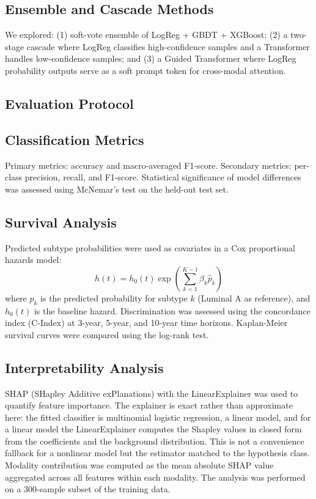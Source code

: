 \documentclass[10pt,journal,compsoc,twocolumn]{IEEEtran}
\begin{document}
\subsection{Ensemble and Cascade Methods}
We explored: (1) soft-vote ensemble of LogReg + GBDT + XGBoost; (2) a two-stage cascade where LogReg classifies high-confidence samples and a Transformer handles low-confidence samples; and (3) a Guided Transformer where LogReg probability outputs serve as a soft prompt token for cross-modal attention.

\subsection{Evaluation Protocol}

\subsection{Classification Metrics}
Primary metrics: accuracy and macro-averaged F1-score. Secondary metrics: per-class precision, recall, and F1-score. Statistical significance of model differences was assessed using McNemar's test on the held-out test set.

\subsection{Survival Analysis}
Predicted subtype probabilities were used as covariates in a Cox proportional hazards model:
\begin{equation}
  h(t) = h_0(t) \exp\left(\sum_{k=1}^{K-1} \beta_k \hat{p}_k\right)
  \label{eq:cox}
\end{equation}
where $\hat{p}_k$ is the predicted probability for subtype $k$ (Luminal A as reference), and $h_0(t)$ is the baseline hazard. Discrimination was assessed using the concordance index (C-Index) at 3-year, 5-year, and 10-year time horizons. Kaplan-Meier survival curves were compared using the log-rank test.

\subsection{Interpretability Analysis}
SHAP (SHapley Additive exPlanations) \cite{lundberg2017unified} with the LinearExplainer was used to quantify feature importance. The explainer is exact rather than approximate here: the fitted classifier is multinomial logistic regression, a linear model, and for a linear model the LinearExplainer computes the Shapley values in closed form from the coefficients and the background distribution. This is not a convenience fallback for a nonlinear model but the estimator matched to the hypothesis class. Modality contribution was computed as the mean absolute SHAP value aggregated across all features within each modality. The analysis was performed on a 300-sample subset of the training data.
\end{document}
